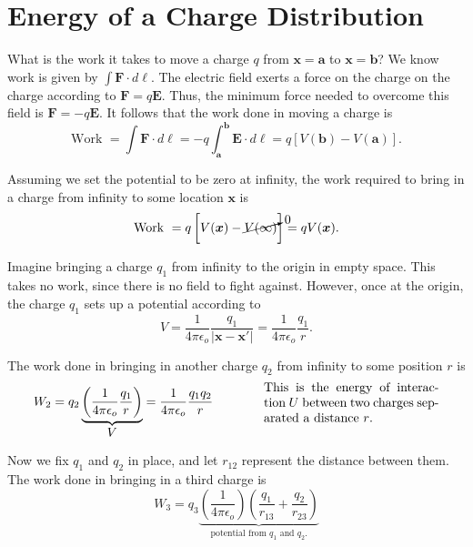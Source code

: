 \documentclass{article}
\begin{document}
\vspace{1em}

\section*{Energy of a Charge Distribution}

What is the work it takes to move a charge $q$ from $\bm{x} = \bm{a}$ to $\bm{x} = \bm{b}$? We know work is given by $\displaystyle \int \bm{F} \cdot d\bm{\ell}$. The electric field exerts a force on the charge on the charge according to $\bm{F} = q\bm{E}$. Thus, the minimum force needed to overcome this field is $\bm{F} = -q\bm{E}$. It follows that the work done in moving a charge is
\begin{equation*}
    \text{Work } = \int \bm{F} \cdot d\bm{\ell} = -q \int_{\bm{a}}^{\bm{b}} \bm{E} \cdot d\bm{\ell} = q \left[ V(\bm{b}) - V(\bm{a}) \right].
\end{equation*}

Assuming we set the potential to be zero at infinity, the work required to bring in a charge from infinity to some location $\bm{x}$ is
\begin{equation*}
    \text{Work } = q \left[ V(\bm{x}) - \cancelto{0}{V(\infty)} \right] = q V(\bm{x}).
\end{equation*}

Imagine bringing a charge $q_1$ from infinity to the origin in empty space. This takes no work, since there is no field to fight against. However, once at the origin, the charge $q_1$ sets up a potential according to
\begin{equation*}
    V = \frac{1}{4\pi\epsilon_o} \frac{q_1}{\left| \bm{x} - \bm{x'} \right|} = \frac{1}{4\pi\epsilon_o} \frac{q_1}{r}.
\end{equation*}

The work done in bringing in another charge $q_2$ from infinity to some position $r$ is
\begin{equation*}
    W_{2} = q_2 \underbrace{\left( \frac{1}{4\pi\epsilon_o} \frac{q_1}{r} \right)}_{\displaystyle V} = \frac{1}{4\pi\epsilon_o} \frac{q_1 q_2}{r} \qquad\qquad \parbox[c]{0.4\textwidth}{This is the energy of interaction $U$ between two charges separated a distance $r$.}
\end{equation*}

Now we fix $q_1$ and $q_2$ in place, and let $r_{12}$ represent the distance between them. The work done in bringing in a third charge is
\begin{equation*}
    W_3 = q_3 \underbrace{\left( \frac{1}{4\pi\epsilon_o} \right) \left( \frac{q_1}{r_{13}} + \frac{q_2}{r_{23}} \right)}_{\displaystyle \text{potential from } q_1 \text{ and } q_2.}
\end{equation*}
\end{document}

